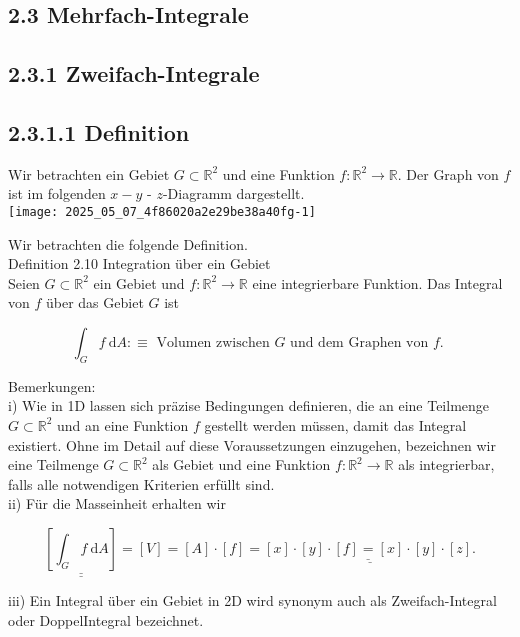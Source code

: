 \documentclass[10pt]{article}
\begin{document}
\subsection*{2.3 Mehrfach-Integrale}
\subsection*{2.3.1 Zweifach-Integrale}
\subsection*{2.3.1.1 Definition}
Wir betrachten ein Gebiet $G \subset \mathbb{R}^{2}$ und eine Funktion $f: \mathbb{R}^{2} \rightarrow \mathbb{R}$. Der Graph von $f$ ist im folgenden $x-y$ - $z$-Diagramm dargestellt.\\
\texttt{[image: 2025\_05\_07\_4f86020a2e29be38a40fg-1]}

Wir betrachten die folgende Definition.\\
Definition 2.10 Integration über ein Gebiet\\
Seien $G \subset \mathbb{R}^{2}$ ein Gebiet und $f: \mathbb{R}^{2} \rightarrow \mathbb{R}$ eine integrierbare Funktion. Das Integral von $f$ über das Gebiet $G$ ist


\begin{equation*}
\int_{G} f \mathrm{~d} A: \equiv \text { Volumen zwischen } G \text { und dem Graphen von } f \text {. } \tag{2.64}
\end{equation*}


Bemerkungen:\\
i) Wie in 1D lassen sich präzise Bedingungen definieren, die an eine Teilmenge $G \subset \mathbb{R}^{2}$ und an eine Funktion $f$ gestellt werden müssen, damit das Integral existiert. Ohne im Detail auf diese Voraussetzungen einzugehen, bezeichnen wir eine Teilmenge $G \subset \mathbb{R}^{2}$ als Gebiet und eine Funktion $f: \mathbb{R}^{2} \rightarrow \mathbb{R}$ als integrierbar, falls alle notwendigen Kriterien erfüllt sind.\\
ii) Für die Masseinheit erhalten wir


\begin{equation*}
\underline{\underline{\left[\int_{G} f \mathrm{~d} A\right]}}=[V]=[A] \cdot[f]=\underline{\underline{[x] \cdot[y] \cdot[f]=[x] \cdot[y] \cdot[z]} .} \tag{2.65}
\end{equation*}


iii) Ein Integral über ein Gebiet in 2D wird synonym auch als Zweifach-Integral oder DoppelIntegral bezeichnet.
\end{document}
